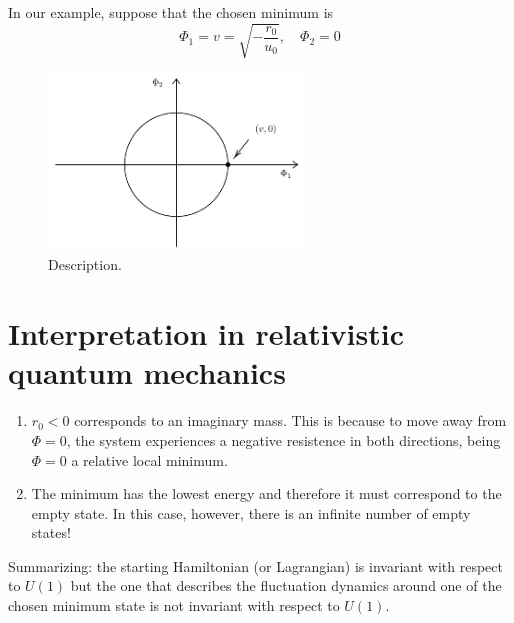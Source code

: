 \documentclass[../main/main.tex]{subfiles}
\begin{document}
In our example, suppose that the chosen minimum is
\begin{equation}
  \Phi _1 = v = \sqrt{- \frac{r_0}{u_0}}, \quad \Phi _2 = 0
\end{equation}
\begin{figure}[h!]
\centering
\includegraphics[width=0.6\textwidth]{../lessons/n_image/4.pdf}
\caption{\label{fig:n_4} Description.}
\end{figure}

\section{Interpretation in relativistic quantum mechanics}
\begin{enumerate}
\item \( r_0 <0 \) corresponds to an imaginary mass. This is because to move away from \( \Phi =0 \), the system experiences a negative resistence in both directions, being \( \Phi =0 \) a relative local minimum.

\item The minimum has the lowest energy and therefore it must correspond to the empty state.
In this case, however, there is an infinite number of empty states!
\end{enumerate}
Summarizing: the starting Hamiltonian (or Lagrangian) is invariant with respect to \( U(1) \) but the one that describes the fluctuation dynamics around one of the chosen minimum state is not invariant with respect to \( U(1) \).
\end{document}
